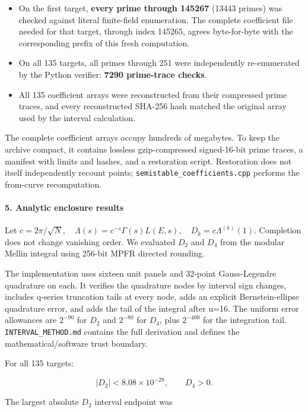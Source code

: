 \documentclass[11pt]{article}
\newcommand{\tightlist}{\setlength{\itemsep}{0pt}\setlength{\parskip}{0pt}}
\begin{document}
\begin{itemize}
\tightlist
\item
  On the first target, \textbf{every prime through 145267} (13443 primes) was checked against literal finite-field enumeration. The complete coefficient file needed for that target, through index 145265, agrees byte-for-byte with the corresponding prefix of this fresh computation.
\item
  On all 135 targets, all primes through 251 were independently re-enumerated by the Python verifier: \textbf{7290 prime-trace checks}.
\item
  All 135 coefficient arrays were reconstructed from their compressed prime traces, and every reconstructed SHA-256 hash matched the original array used by the interval calculation.
\end{itemize}

The complete coefficient arrays occupy hundreds of megabytes. To keep the archive compact, it contains lossless gzip-compressed signed-16-bit prime traces, a manifest with limits and hashes, and a restoration script. Restoration does not itself independently recount points; \nolinkurl{semistable_coefficients.cpp} performs the from-curve recomputation.

\paragraph{5. Analytic enclosure results}

Let \(c=2\pi/\sqrt N,\quad \Lambda(s)=c^{-s}\Gamma(s)L(E,s),\quad D_k=c\Lambda^{(k)}(1)\). Completion does not change vanishing order. We evaluated \(D_2\) and \(D_4\) from the modular Mellin integral using 256-bit MPFR directed rounding.

The implementation uses sixteen unit panels and 32-point Gauss-Legendre quadrature on each. It verifies the quadrature nodes by interval sign changes, includes q-series truncation tails at every node, adds an explicit Bernstein-ellipse quadrature error, and adds the tail of the integral after u=16. The uniform error allowances are \(2^{-90}\) for \(D_2\) and \(2^{-80}\) for \(D_4\), plus \(2^{-400}\) for the integration tail. \nolinkurl{INTERVAL_METHOD.md} contains the full derivation and defines the mathematical/software trust boundary.

For all 135 targets:

\[
|D_2|<8.08\times10^{-28},\qquad D_4>0.
\]

The largest absolute \(D_2\) interval endpoint was
\end{document}
